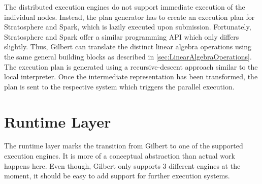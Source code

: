 The distributed execution engines do not support immediate execution of the individual nodes.
Instead, the plan generator has to create an execution plan for Stratosphere and Spark, which is lazily executed upon submission.
Fortunately, Stratosphere and Spark offer a similar programming API which only differs slightly.
Thus, Gilbert can translate the distinct linear algebra operations using the same general building blocks as described in \cref{sec:LinearAlgebraOperations}.
The execution plan is generated using a recursive-descent approach similar to the local interpreter.
Once the intermediate representation has been transformed, the plan is sent to the respective system which triggers the parallel execution.

\section{Runtime Layer}

The runtime layer marks the transition from Gilbert to one of the supported execution engines.
It is more of a conceptual abstraction than actual work happens here.
Even though, Gilbert only supports 3 different engines at the moment, it should be easy to add support for further execution systems.

